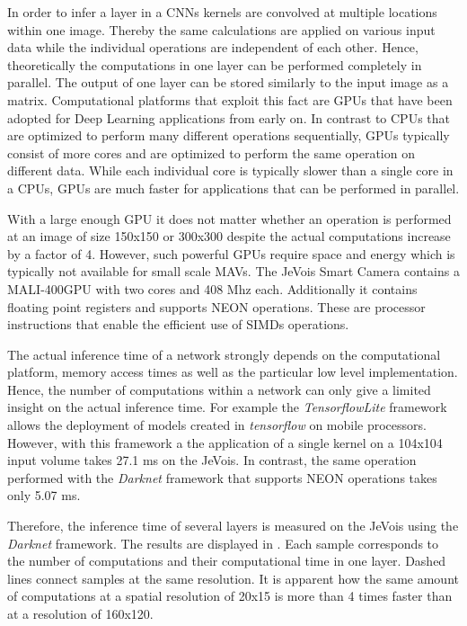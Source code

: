 In order to infer a layer in a \acp{CNN} kernels are convolved at multiple locations within one image. Thereby the same calculations are applied on various input data while the individual operations are independent of each other. Hence, theoretically the computations in one layer can be performed completely in parallel. The output of one layer can be stored similarly to the input image as a matrix. Computational platforms that exploit this fact are \acp{GPU} that have been adopted for Deep Learning applications from early on. In contrast to \acp{CPU} that are optimized to perform many different operations sequentially, \acp{GPU} typically consist of more cores and are optimized to perform the same operation on different data. While each individual core is typically slower than a single core in a \acp{CPU}, \acp{GPU} are much faster for applications that can be performed in parallel.

With a large enough \ac{GPU} it does not matter whether an operation is performed at an image of size 150x150 or 300x300 despite the actual computations increase by a factor of 4. However, such powerful \acp{GPU} require space and energy which is typically not available for small scale \acp{MAV}. The JeVois Smart Camera contains a MALI-400GPU with two cores and 408 Mhz each. Additionally it contains floating point registers and supports NEON operations. These are processor instructions that enable the efficient use of \acp{SIMD} operations.

The actual inference time of a network strongly depends on the computational platform, memory access times as well as the particular low level implementation. Hence, the number of computations within a network can only give a limited insight on the actual inference time. For example the \textit{TensorflowLite} framework allows the deployment of models created in \textit{tensorflow} on mobile processors. However, with this framework a the application of a single kernel on a 104x104 input volume takes 27.1 ms on the JeVois. In contrast, the same operation performed with the \textit{Darknet} framework that supports NEON operations takes only 5.07 ms. 

Therefore, the inference time of several layers is measured on the JeVois using the \textit{Darknet} framework. The results are displayed in . Each sample corresponds to the number of computations and their computational time in one layer. Dashed lines connect samples at the same resolution. It is apparent how the same amount of computations at a spatial resolution of 20x15 is more than 4 times faster than at a resolution of 160x120. 

